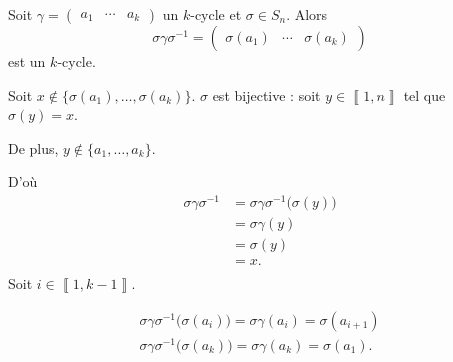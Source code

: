 \begin{prop}
	Soit $\gamma = \begin{pmatrix}
		a_1&\cdots&a_k
	\end{pmatrix}$ un $k$-cycle et $\sigma \in S_n$. Alors \[
		\sigma\gamma\sigma^{-1} = \begin{pmatrix}
			\sigma(a_1)&\cdots&\sigma(a_k)
		\end{pmatrix}
	\] est un $k$-cycle.
\end{prop}

\begin{prv}
	Soit $x \not\in \{\sigma(a_1), \ldots, \sigma(a_k)\}$. $\sigma$ est bijective : soit $y \in \left\llbracket 1,n \right\rrbracket$ tel que $\sigma(y) = x$.

	De plus, $y \not\in \{a_1, \ldots, a_k\}$.

	D'où
	\begin{align*}
		\sigma\gamma\sigma^{-1} &= \sigma\gamma\sigma^{-1}\big(\sigma(y)\big)  \\
		&= \sigma\gamma(y) \\
		&= \sigma(y) \\
		&= x. \\
	\end{align*}
	Soit $i \in \left\llbracket 1,k-1 \right\rrbracket$.

	\begin{align*}
		\sigma\gamma\sigma^{-1}\big(\sigma(a_i)\big) = \sigma\gamma(a_i) = \sigma(a_{i+1})\\
		\sigma\gamma\sigma^{-1}\big(\sigma(a_k)\big)  = \sigma\gamma(a_k) = \sigma(a_1).
	\end{align*}
\end{prv}
